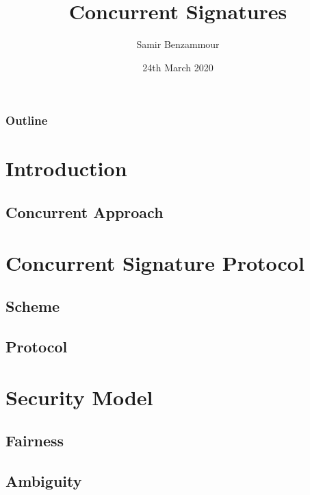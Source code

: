 \documentclass[usenames,dvipsnames]{beamer}
\title{Concurrent Signatures}
\author{Samir Benzammour}
\date{24th March 2020}
\institute[RWTH]{
  Algorithms and Computational Complexity\\
  RWTH Aachen University
}
\begin{document}
\frame{\titlepage}

\begin{frame}
	\frametitle{Outline}
	\tableofcontents
\end{frame}

\section{Introduction}


\subsection{Concurrent Approach}


\section{Concurrent Signature Protocol}

  \subsection{Scheme}
  

  \subsection{Protocol}
  

\section{Security Model}


  \subsection{Fairness}
  

  \subsection{Ambiguity}
  
\end{document}
